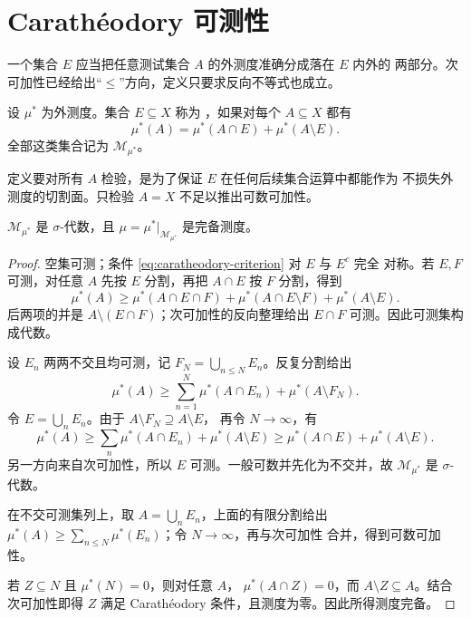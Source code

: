 \section{Carathéodory 可测性}

一个集合 $E$ 应当把任意测试集合 $A$ 的外测度准确分成落在 $E$ 内外的
两部分。次可加性已经给出“$\le$”方向，定义只要求反向不等式也成立。

\begin{definition}
设 $\mu^*$ 为外测度。集合 $E\subseteq X$ 称为
，如果对每个 $A\subseteq X$ 都有
\begin{equation}
 \mu^*(A)=\mu^*(A\cap E)+\mu^*(A\setminus E).
 \label{eq:caratheodory-criterion}
\end{equation}
全部这类集合记为 $\mathcal M_{\mu^*}$。
\end{definition}

定义要对所有 $A$ 检验，是为了保证 $E$ 在任何后续集合运算中都能作为
不损失外测度的切割面。只检验 $A=X$ 不足以推出可数可加性。

\begin{theorem}[Carathéodory]
\label{thm:caratheodory-measurable-sets}
$\mathcal M_{\mu^*}$ 是 $\sigma$-代数，且
$\mu=\mu^*|_{\mathcal M_{\mu^*}}$ 是完备测度。
\end{theorem}

\begin{proof}
空集可测；条件 \eqref{eq:caratheodory-criterion} 对 $E$ 与 $E^c$ 完全
对称。若 $E,F$ 可测，对任意 $A$ 先按 $E$ 分割，再把 $A\cap E$ 按 $F$
分割，得到
\[
 \mu^*(A)\ge
 \mu^*(A\cap E\cap F)+\mu^*(A\cap E\setminus F)
 +\mu^*(A\setminus E).
\]
后两项的并是 $A\setminus(E\cap F)$；次可加性的反向整理给出
$E\cap F$ 可测。因此可测集构成代数。

设 $E_n$ 两两不交且均可测，记 $F_N=\bigcup_{n\le N}E_n$。反复分割给出
\[
 \mu^*(A)\ge
 \sum_{n=1}^N\mu^*(A\cap E_n)+\mu^*(A\setminus F_N).
\]
令 $E=\bigcup_nE_n$。由于 $A\setminus F_N\supseteq A\setminus E$，
再令 $N\to\infty$，有
\[
 \mu^*(A)\ge
 \sum_n\mu^*(A\cap E_n)+\mu^*(A\setminus E)
 \ge\mu^*(A\cap E)+\mu^*(A\setminus E).
\]
另一方向来自次可加性，所以 $E$ 可测。一般可数并先化为不交并，故
$\mathcal M_{\mu^*}$ 是 $\sigma$-代数。

在不交可测集列上，取 $A=\bigcup_nE_n$，上面的有限分割给出
$\mu^*(A)\ge\sum_{n\le N}\mu^*(E_n)$；令 $N\to\infty$，再与次可加性
合并，得到可数可加性。

若 $Z\subseteq N$ 且 $\mu^*(N)=0$，则对任意 $A$，
$\mu^*(A\cap Z)=0$，而 $A\setminus Z\subseteq A$。结合次可加性即得
$Z$ 满足 Carathéodory 条件，且测度为零。因此所得测度完备。
\end{proof}

